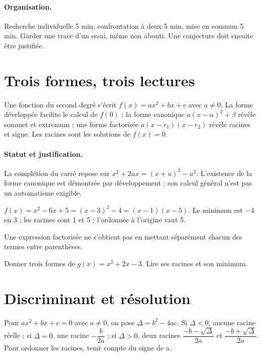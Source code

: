 \paragraph{Organisation.} Recherche individuelle 5 min, confrontation à deux 5 min, mise en commun 5 min. Garder une trace d’un essai, même non abouti. Une conjecture doit ensuite être justifiée.
\mxnewpage
\section{Trois formes, trois lectures}\label{C02-U1}
\begin{keypoint}
Une fonction du second degré s’écrit $f(x)=ax^2+bx+c$ avec $a\ne0$. La forme développée facilite le calcul de $f(0)$ ; la forme canonique $a(x-\alpha)^2+\beta$ révèle sommet et extremum ; une forme factorisée $a(x-r_1)(x-r_2)$ révèle racines et signe. Les racines sont les solutions de $f(x)=0$.
\end{keypoint}
\paragraph{Statut et justification.} La complétion du carré repose sur $x^2+2ux=(x+u)^2-u^2$. L’existence de la forme canonique est démontrée par développement ; son calcul général n’est pas un automatisme exigible.
\begin{example}$f(x)=x^2-6x+5=(x-3)^2-4=(x-1)(x-5)$. Le minimum est $-4$ en 3 ; les racines sont 1 et 5 ; l’ordonnée à l’origine vaut 5.\end{example}\label{C02-EX1}
\begin{pitfall}Une expression factorisée ne s’obtient pas en mettant séparément chacun des termes entre parenthèses.\end{pitfall}
\begin{application}Donner trois formes de $g(x)=x^2+2x-3$. Lire ses racines et son minimum.\end{application}\label{C02-AP1}
\section{Discriminant et résolution}\label{C02-U2}
\begin{keypoint}
Pour $ax^2+bx+c=0$ avec $a\ne0$, on pose $\Delta=b^2-4ac$. Si $\Delta<0$, aucune racine réelle ; si $\Delta=0$, une racine $-\dfrac{b}{2a}$ ; si $\Delta>0$, deux racines $\dfrac{-b-\sqrt\Delta}{2a}$ et $\dfrac{-b+\sqrt\Delta}{2a}$. Pour ordonner les racines, tenir compte du signe de a.
\end{keypoint}
